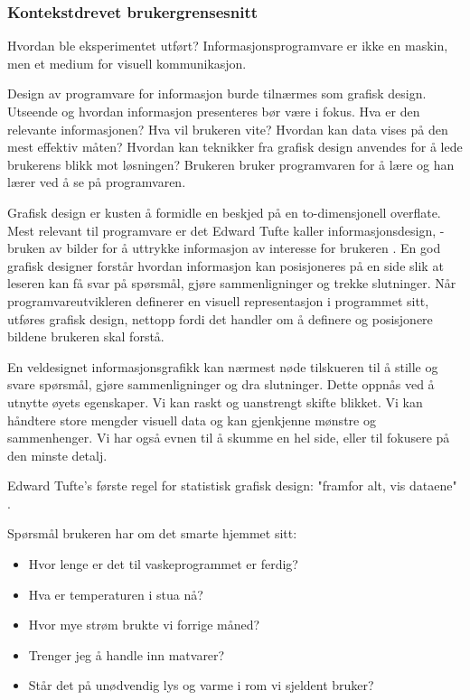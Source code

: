 \subsubsection{Kontekstdrevet brukergrensesnitt}
{\color{red}Hvordan ble eksperimentet utført?}
Informasjonsprogramvare er ikke en maskin, men et medium for visuell kommunikasjon.

Design av programvare for informasjon burde tilnærmes som grafisk design. Utseende og hvordan informasjon presenteres bør være i fokus. Hva er den relevante informasjonen? Hva vil brukeren vite? Hvordan kan data vises på den mest effektiv måten? Hvordan kan teknikker fra grafisk design anvendes for å lede brukerens blikk mot løsningen? Brukeren bruker programvaren for å lære og han lærer ved å se på programvaren.

Grafisk design er kusten å formidle en beskjed på en to-dimensjonell overflate. Mest relevant til programvare er det Edward Tufte kaller informasjonsdesign, -bruken av bilder for å uttrykke informasjon av interesse for brukeren \citet{tufte01}. En god grafisk designer forstår hvordan informasjon kan posisjoneres på en side slik at leseren kan få svar på spørsmål, gjøre sammenligninger og trekke slutninger. Når programvareutvikleren definerer en visuell representasjon i programmet sitt, utføres grafisk design, nettopp fordi det handler om å definere og posisjonere bildene brukeren skal forstå.

En veldesignet informasjonsgrafikk kan nærmest nøde tilskueren til å stille og svare spørsmål, gjøre sammenligninger og dra slutninger. Dette oppnås ved å utnytte øyets egenskaper. Vi kan raskt og uanstrengt skifte blikket. Vi kan håndtere store mengder visuell data og kan gjenkjenne mønstre og sammenhenger. Vi har også evnen til å skumme en hel side, eller til fokusere på den minste detalj.

Edward Tufte's første regel for statistisk grafisk design: "framfor alt, vis dataene" \citet{tufte01}.

Spørsmål brukeren har om det smarte hjemmet sitt:
\begin{itemize}
\item Hvor lenge er det til vaskeprogrammet er ferdig?
\item Hva er temperaturen i stua nå?
\item Hvor mye strøm brukte vi forrige måned?
\item Trenger jeg å handle inn matvarer?
\item Står det på unødvendig lys og varme i rom vi sjeldent bruker?
\end{itemize}

